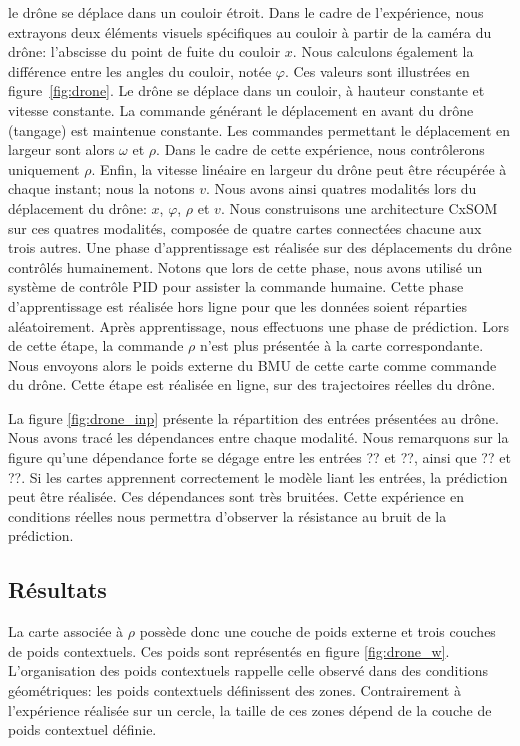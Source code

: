 le drône se déplace dans un couloir étroit.
Dans le cadre de l'expérience, nous extrayons deux éléments visuels spécifiques au couloir à partir de la caméra du drône: l'abscisse du point de fuite du couloir $x$. Nous calculons également la différence entre les angles du couloir, notée $\varphi$. Ces valeurs sont illustrées en figure~\ref{fig:drone}.
Le drône se déplace dans un couloir, à hauteur constante et vitesse constante.
La commande générant le déplacement en avant du drône (tangage) est maintenue constante. Les commandes permettant le déplacement en largeur sont alors $\omega$ et $\rho$. Dans le cadre de cette expérience, nous contrôlerons uniquement $\rho$.
Enfin, la vitesse linéaire en largeur du drône peut être récupérée à chaque instant; nous la notons $v$.
Nous avons ainsi quatres modalités lors du déplacement du drône: $x$, $\varphi$, $\rho$ et $v$.
Nous construisons une architecture CxSOM sur ces quatres modalités, composée de quatre cartes connectées chacune aux trois autres.
Une phase d'apprentissage est réalisée sur des déplacements du drône contrôlés humainement. Notons que lors de cette phase, nous avons utilisé un système de contrôle PID pour assister la commande humaine. Cette phase d'apprentissage est réalisée hors ligne pour que les données soient réparties aléatoirement.
Après apprentissage, nous effectuons une phase de prédiction. Lors de cette étape, la commande $\rho$ n'est plus présentée à la carte correspondante. Nous envoyons alors le poids externe du BMU de cette carte comme commande du drône. Cette étape est réalisée en ligne, sur des trajectoires réelles du drône.

La figure \ref{fig:drone_inp} présente la répartition des entrées présentées au drône. Nous avons tracé les dépendances entre chaque modalité. Nous remarquons sur la figure qu'une dépendance forte se dégage entre les entrées ?? et ??, ainsi que ?? et ??. Si les cartes apprennent correctement le modèle liant les entrées, la prédiction peut être réalisée.
Ces dépendances sont très bruitées. Cette expérience en conditions réelles nous permettra d'observer la résistance au bruit de la prédiction.


\subsection{Résultats}
La carte associée à $\rho$ possède donc une couche de poids externe et trois couches de poids contextuels. Ces poids sont représentés en figure \ref{fig:drone_w}. L'organisation des poids contextuels rappelle celle observé dans des conditions géométriques: les poids contextuels définissent des zones. Contrairement à l'expérience réalisée sur un cercle, la taille de ces zones dépend de la couche de poids contextuel définie. 

